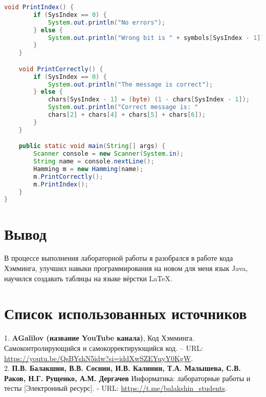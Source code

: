 \begin{flushleft}
\begin{lstlisting}[caption={Исходный код программы}, language=Java, captionpos=b]
    void PrintIndex() {
        if (SysIndex == 0) {
            System.out.println("No errors");
        } else {
            System.out.println("Wrong bit is " + symbols[SysIndex - 1]);
        }
    }

    void PrintCorrectly() {
        if (SysIndex == 0) {
            System.out.println("The message is correct");
        } else {
            chars[SysIndex - 1] = (byte) (1 - chars[SysIndex - 1]);
            System.out.println("Correct message is: " 
            chars[2] + chars[4] + chars[5] + chars[6]);
        }
    }

    public static void main(String[] args) {
        Scanner console = new Scanner(System.in);
        String name = console.nextLine();
        Hamming m = new Hamming(name);
        m.PrintCorrectly();
        m.PrintIndex();
    }
}
\end{lstlisting}

\section{Вывод}
В процессе выполнения лабораторной работы я разобрался в работе кода Хэмминга, улучшил навыки программирования на новом для меня язык Java, научился создавать таблицы на языке вёрстки \LaTeX.

\section{Список использованных источников}
1. \textbf{AGalilov (название YouTube канала)}, Код Хэмминга. Самоконтролирующийся и самокорректирующийся код. – URL: \href{https://youtu.be/QsBYshN5idw?si=iddXwSZEYuyY0KgW}{https://youtu.be/QsBYshN5idw?si=iddXwSZEYuyY0KgW}. \\
2. \textbf{П.В. Балакшин, В.В. Соснин, И.В. Калинин, Т.А. Малышева, С.В. Раков, Н.Г. Рущенко, А.М. Дергачев} Информатика: лабораторные работы и тесты [Электронный ресурс]. - URL: \href{https://t.me/balakshin_students}{https://t.me/balakshin\_students}.
\end{flushleft}

